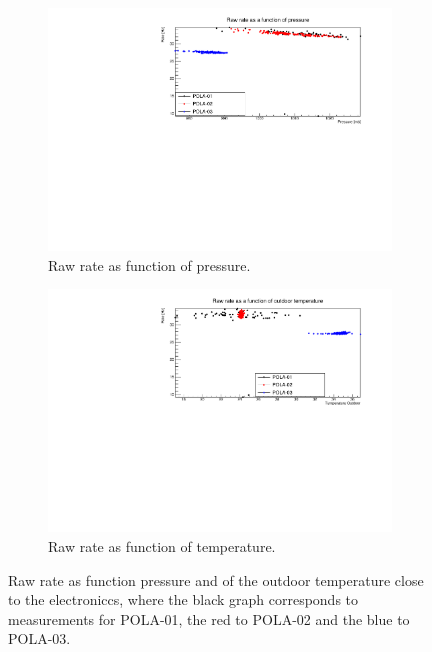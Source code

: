 \documentclass[12pt,a4paper]{amsart}
\begin{document}
\begin{figure}
\centering
	\begin{subfigure}[b]{0.6\textwidth}
	\centering
		\includegraphics[width=\textwidth]{../data/plots/RawRate_pressure_all.pdf}
		\caption{Raw rate as function of pressure.}
		\label{fig:RawRate_pressure}
	\end{subfigure}%
	\begin{subfigure}[b]{0.6\textwidth}
	\centering
		\includegraphics[width=\textwidth]{../data/plots/RawRate_OutdoorTemp_all.pdf}
		\caption{Raw rate as function of temperature.}
		\label{fig:RawRate_OutdoorTemp}
	\end{subfigure}
	\caption{Raw rate as function pressure and of the outdoor temperature close to the electroniccs, where the black graph corresponds to measurements for POLA-01, the red to POLA-02 and the blue to POLA-03.}
	\label{fig:rawrate_pressure_temp}
\end{figure}
\end{document}
